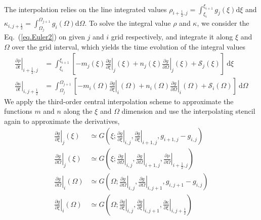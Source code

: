 The interpolation relies on the line integrated values $\rho_{i+\frac{1}{2},j}=\int_{\xi_i}^{\xi_{i+1}}g_{j}(\xi)\mathrm{d}\xi$ and $\kappa_{i,j+\frac{1}{2}}=\int_{\Omega_j}^{\Omega_{j+1}}g_{i}(\Omega)\mathrm{d}\Omega$.
To solve the integral value $\rho$ and $\kappa$, we consider the Eq.~(\ref{eq.Euler2}) on given $j$ and $i$ grid respectively, and integrate it along $\xi$ and $\Omega$ over the grid interval, which yields the time evolution of the integral values
\begin{equation}\label{eq.line}
    \begin{aligned}
    \left.\frac{\partial \rho}{\partial t}\right|_{i+\frac{1}{2},j} &= \int_{\xi_i}^{\xi_{i+1}}[ - m_j(\xi) \left.\frac{\partial g}{\partial \xi}\right|_{j}(\xi) + n_j(\xi) \left.\frac{\partial g}{\partial \Omega}\right|_{j}(\xi) + \mathcal{S}_j(\xi)]~\mathrm{d} \xi
    \\
    \left.\frac{\partial \kappa}{\partial t}\right|_{i,j+\frac{1}{2}}
    &= \int_{\Omega_j}^{\Omega_{j+1}}[ - m_i(\Omega) \left.\frac{\partial g}{\partial \xi}\right|_{i}(\Omega) + n_i(\Omega) \left.\frac{\partial g}{\partial \Omega}\right|_{i}(\Omega) + \mathcal{S}_i(\Omega)]~\mathrm{d} \Omega
    \end{aligned}
\end{equation}
We apply the third-order central interpolation scheme to approximate the functions $m$ and $n$ along the $\xi$ and $\Omega$ dimension and use the interpolating stencil again to approximate the derivatives, 
\begin{equation}
    \begin{aligned}
       \left.\frac{\partial g}{\partial \xi}\right|_{j}(\xi)
        &\simeq G\left(\xi;\left.\frac{\partial g}{\partial \xi}\right|_{i,j},\left.\frac{\partial g}{\partial \xi}\right|_{i+1,j},g_{i+1,j}-g_{i,j}\right)
        \\
        \left.\frac{\partial g}{\partial \Omega}\right|_{j}(\xi)
         &\simeq G\left(\xi;\left.\frac{\partial g}{\partial \Omega}\right|_{i,j},\left.\frac{\partial g}{\partial \Omega}\right|_{i+1,j},    \left.\frac{\partial \rho}{\partial \Omega}\right|_{i+\frac{1}{2},j}\right)
         \\
         \left.\frac{\partial g}{\partial \Omega}\right|_{i}(\Omega) 
     &\simeq G\left(\Omega;\left.\frac{\partial g}{\partial \Omega}\right|_{i,j},\left.\frac{\partial g}{\partial \Omega}\right|_{i,j+1},g_{i,j+1}-g_{i,j}\right)\\
         \left.\frac{\partial g}{\partial \xi}\right|_{i}(\Omega) 
  &\simeq G\left(\Omega;\left.\frac{\partial g}{\partial \xi}\right|_{i,j},\left.\frac{\partial g}{\partial \xi}\right|_{i,j+1},\left.\frac{\partial \kappa}{\partial \xi}\right|_{i,j+\frac{1}{2}}\right)
    \end{aligned}
\end{equation}
